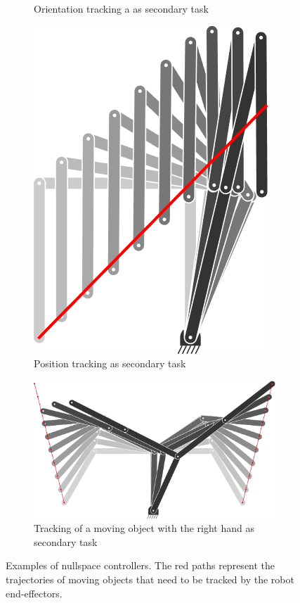 \documentclass[10pt,a4paper]{article} %
\begin{document}
\begin{figure}
\begin{subfigure}[b]{.23\textwidth}
	\caption{Orientation tracking a as secondary task}
\end{subfigure}
\hfill
\begin{subfigure}[b]{.17\textwidth}
	\centering
	\includegraphics[width=.8\textwidth]{images/IK_nullspace03.png}
	\caption{Position tracking as secondary task}
\end{subfigure}
\hfill
\begin{subfigure}[b]{.34\textwidth}
	\centering
	\includegraphics[width=.9\textwidth]{images/IK_nullspace04.png}
	\caption{Tracking of a moving object with the right hand as secondary task}
\end{subfigure}
\caption{\footnotesize
Examples of nullspace controllers. The red paths represent the trajectories of moving objects that need to be tracked by the robot end-effectors.
}
\label{fig:nullspace}
\end{figure}
\end{document}
